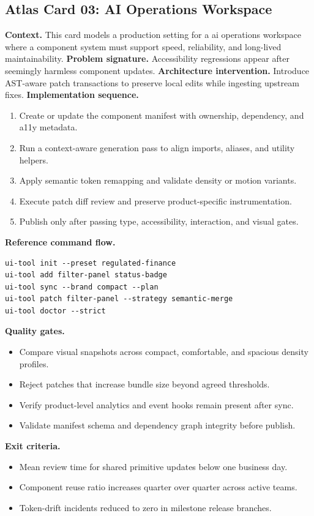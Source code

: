 \subsection*{Atlas Card 03: AI Operations Workspace}
\textbf{Context.} This card models a production setting for a ai operations workspace where a component system must support speed, reliability, and long-lived maintainability.
\textbf{Problem signature.} Accessibility regressions appear after seemingly harmless component updates.
\textbf{Architecture intervention.} Introduce AST-aware patch transactions to preserve local edits while ingesting upstream fixes.
\textbf{Implementation sequence.}
\begin{enumerate}[leftmargin=*, itemsep=0.28em]
  \item Create or update the component manifest with ownership, dependency, and a11y metadata.
  \item Run a context-aware generation pass to align imports, aliases, and utility helpers.
  \item Apply semantic token remapping and validate density or motion variants.
  \item Execute patch diff review and preserve product-specific instrumentation.
  \item Publish only after passing type, accessibility, interaction, and visual gates.
\end{enumerate}
\textbf{Reference command flow.}
\begin{verbatim}
ui-tool init --preset regulated-finance
ui-tool add filter-panel status-badge
ui-tool sync --brand compact --plan
ui-tool patch filter-panel --strategy semantic-merge
ui-tool doctor --strict
\end{verbatim}
\textbf{Quality gates.}
\begin{itemize}[leftmargin=*, itemsep=0.24em]
  \item Compare visual snapshots across compact, comfortable, and spacious density profiles.
  \item Reject patches that increase bundle size beyond agreed thresholds.
  \item Verify product-level analytics and event hooks remain present after sync.
  \item Validate manifest schema and dependency graph integrity before publish.
\end{itemize}
\textbf{Exit criteria.}
\begin{itemize}[leftmargin=*, itemsep=0.24em]
  \item Mean review time for shared primitive updates below one business day.
  \item Component reuse ratio increases quarter over quarter across active teams.
  \item Token-drift incidents reduced to zero in milestone release branches.
\end{itemize}
\clearpage

